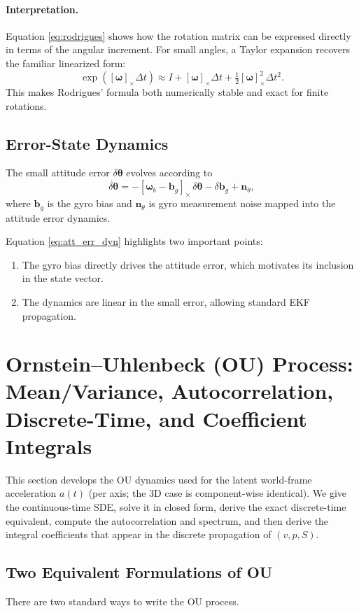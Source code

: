 \documentclass[10pt]{extarticle}
\begin{document}
\paragraph{Interpretation.}
Equation \eqref{eq:rodrigues} shows how the rotation matrix can be expressed 
directly in terms of the angular increment. 
For small angles, a Taylor expansion recovers the familiar linearized form:
\[
\exp([\bm\omega]_\times \Delta t) \approx I + [\bm\omega]_\times \Delta t + \tfrac{1}{2} [\bm\omega]_\times^2 \Delta t^2.
\]
This makes Rodrigues' formula both numerically stable and exact for finite rotations.

\subsection{Error-State Dynamics}
The small attitude error $\delta\bm\theta$ evolves according to
\begin{equation}
\dot{\delta\bm\theta} = -[\bm\omega_b - \bm b_g]_\times \, \delta\bm\theta - \delta\bm b_g + \bm n_\theta,
\label{eq:att_err_dyn}
\end{equation}
where $\bm b_g$ is the gyro bias and $\bm n_\theta$ is gyro measurement noise mapped into the attitude error dynamics.

Equation \eqref{eq:att_err_dyn} highlights two important points:
\begin{enumerate}
\item The gyro bias directly drives the attitude error, which motivates its inclusion in the state vector.
\item The dynamics are linear in the small error, allowing standard EKF propagation.
\end{enumerate}

\section{Ornstein--Uhlenbeck (OU) Process: Mean/Variance, Autocorrelation, Discrete-Time, and Coefficient Integrals}
\label{sec:ou-detailed}

This section develops the OU dynamics used for the latent world-frame acceleration $a(t)$
(per axis; the 3D case is component-wise identical). We give the continuous-time SDE,
solve it in closed form, derive the exact discrete-time equivalent, compute the
autocorrelation and spectrum, and then derive the integral coefficients that appear
in the discrete propagation of $(v,p,S)$.

\subsection{Two Equivalent Formulations of OU}
There are two standard ways to write the OU process.
\end{document}
